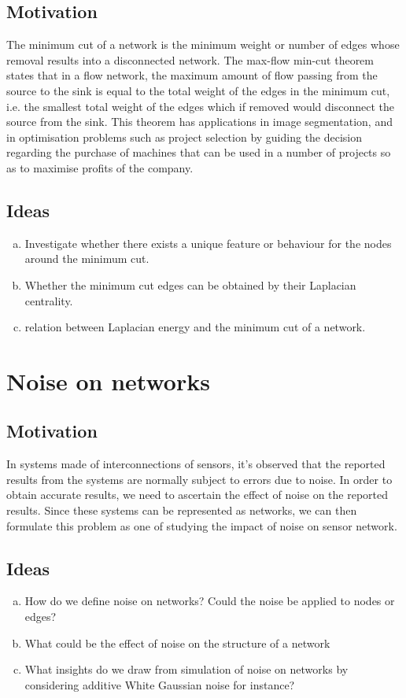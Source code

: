 \documentclass[10pt,a4paper]{article}
\begin{document}
	\subsection{Motivation}
	The minimum cut of a network is the minimum weight or number of edges whose removal results into a disconnected network. The max-flow min-cut theorem states that in a flow network, the maximum amount of flow passing from the source to the sink is equal to the total weight of the edges in the minimum cut, i.e. the smallest total weight of the edges which if removed would disconnect the source from the sink. This theorem has applications in image segmentation, and in optimisation problems such as project selection by guiding the decision regarding the purchase of machines that can be used in a number of projects so as to maximise profits of the company.
	\subsection{Ideas}
	\begin{enumerate}[a)]
	\item Investigate whether there exists a unique feature or behaviour for the nodes around the minimum cut.
	\item Whether the minimum cut edges can be obtained by their Laplacian centrality.
	\item  relation between Laplacian energy and the minimum cut of a network.
	\end{enumerate}
	\section{Noise on networks}
	\subsection{Motivation}
	In systems made of interconnections of sensors, it's observed that the reported results from  the systems are normally subject to errors due to noise. In order to obtain accurate results, we need to ascertain the effect of noise on the reported results. Since these systems can be represented as networks, we can then formulate this problem as one of studying the impact of noise on sensor network. 
	\subsection{Ideas}
	\begin{enumerate}[a)]
		\item How do we define noise on networks? Could the noise be applied to nodes or edges? 
		\item What could be the effect of noise on the structure of a network
		\item What insights do we draw from simulation of noise on networks by considering additive White Gaussian noise for instance?
	\end{enumerate}
	
\end{document}
